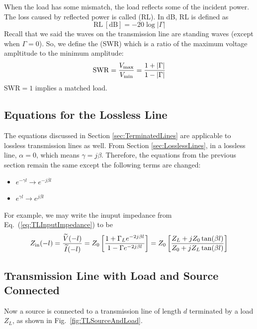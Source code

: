 When the load has some mismatch, the load reflects some of the incident power. The loss caused by reflected power is called  (RL). In dB, RL is defined as 
\begin{equation}
    \mathrm{RL}\ [\mathrm{dB}] = -20\log|\Gamma| 
\end{equation}
Recall that we said the waves on the transmission line are standing waves (except when $\Gamma = 0$). So, we define the  (SWR) which is a ratio of the maximum voltage ampltitude to the minimum amplitude: 
\begin{equation}
    \mathrm{SWR} = \dfrac{V_{\mathrm{max}}}{V_{\mathrm{min}}} = \dfrac{1+|\Gamma|}{1-|\Gamma|}
\end{equation}
$\mathrm{SWR}=1$ implies a matched load. 

\subsection{Equations for the Lossless Line}
The equations discussed in Section \ref{sec:TerminatedLines} are applicable to lossless transmission lines as well. From Section \ref{sec:LosslessLines}, in a lossless line, $\alpha=0$, which means $\gamma = j\beta$. Therefore, the equations from the previous section remain the same except the following terms are changed: 
\begin{itemize}
    \item $e^{-\gamma l} \longrightarrow e^{-j\beta l}$
    \item $e^{\gamma l} \longrightarrow e^{j\beta l}$
\end{itemize}
For example, we may write the inuput impedance from Eq.\ (\ref{eq:TLInputImpedance}) to be 
\begin{equation}
    Z_{\mathrm{in}}(-l) = \dfrac{\widetilde{V}(-l)}{\widetilde{I}(-l)} = Z_0 \left[\dfrac{1+\Gamma_L e^{-2j\beta l}}{1 - \Gamma e^{-2j\beta l}}\right] = Z_0 \left[ \dfrac{Z_L+jZ_0\tan(\beta l)}{Z_0 + jZ_L\tan(\beta l)} \right] 
\end{equation}

\subsection{Transmission Line with Load and Source Connected}

Now a source is connected to a transmission line of length $d$ terminated by a load $Z_L$, as shown in Fig.\ \ref{fig:TLSourceAndLoad}.

